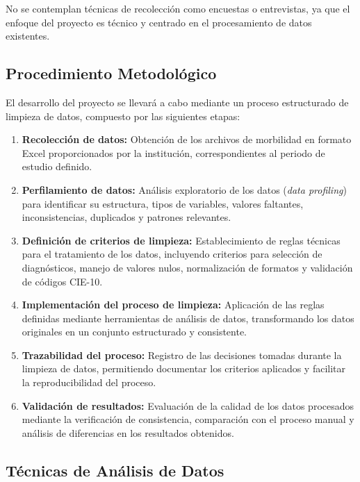 \documentclass[12pt, letterpaper, oneside]{article}
\begin{document}
No se contemplan técnicas de recolección como encuestas o entrevistas, ya que el enfoque del proyecto es técnico y centrado en el procesamiento de datos existentes.

\subsection{Procedimiento Metodológico}

El desarrollo del proyecto se llevará a cabo mediante un proceso estructurado de limpieza de datos, compuesto por las siguientes etapas:

\begin{enumerate}

\item \textbf{Recolección de datos:} Obtención de los archivos de morbilidad en formato Excel proporcionados por la institución, correspondientes al periodo de estudio definido.

\item \textbf{Perfilamiento de datos:} Análisis exploratorio de los datos (\textit{data profiling}) para identificar su estructura, tipos de variables, valores faltantes, inconsistencias, duplicados y patrones relevantes.

\item \textbf{Definición de criterios de limpieza:} Establecimiento de reglas técnicas para el tratamiento de los datos, incluyendo criterios para selección de diagnósticos, manejo de valores nulos, normalización de formatos y validación de códigos CIE-10.

\item \textbf{Implementación del proceso de limpieza:} Aplicación de las reglas definidas mediante herramientas de análisis de datos, transformando los datos originales en un conjunto estructurado y consistente.

\item \textbf{Trazabilidad del proceso:} Registro de las decisiones tomadas durante la limpieza de datos, permitiendo documentar los criterios aplicados y facilitar la reproducibilidad del proceso.

\item \textbf{Validación de resultados:} Evaluación de la calidad de los datos procesados mediante la verificación de consistencia, comparación con el proceso manual y análisis de diferencias en los resultados obtenidos.

\end{enumerate}

\subsection{Técnicas de Análisis de Datos}
\end{document}

